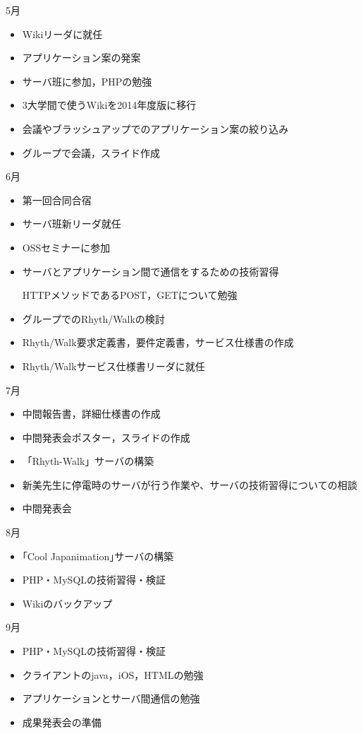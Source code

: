 \par
5月
\begin{itemize}
\item Wikiリーダに就任
\item アプリケーション案の発案
\item サーバ班に参加，PHPの勉強
\item 3大学間で使うWikiを2014年度版に移行
\item 会議やブラッシュアップでのアプリケーション案の絞り込み
\item グループで会議，スライド作成
\end{itemize}
6月
\begin{itemize}
\item 第一回合同合宿
\item サーバ班新リーダ就任
\item OSSセミナーに参加
\item サーバとアプリケーション間で通信をするための技術習得
\par  HTTPメソッドであるPOST，GETについて勉強
\item グループでのRhyth/Walkの検討
\item Rhyth/Walk要求定義書，要件定義書，サービス仕様書の作成
\item Rhyth/Walkサービス仕様書リーダに就任
\end{itemize}
7月
\begin{itemize}
\item 中間報告書，詳細仕様書の作成
\item 中間発表会ポスター，スライドの作成
\item 「Rhyth-Walk」サーバの構築
\item 新美先生に停電時のサーバが行う作業や、サーバの技術習得についての相談
\item 中間発表会
\end{itemize}
8月
\begin{itemize}
\item ｢Cool Japanimation｣サーバの構築
\item PHP・MySQLの技術習得・検証
\item Wikiのバックアップ
\end{itemize}
9月
\begin{itemize}
\item PHP・MySQLの技術習得・検証
\item クライアントのjava，iOS，HTMLの勉強
\item アプリケーションとサーバ間通信の勉強
\item 成果発表会の準備
\end{itemize}
